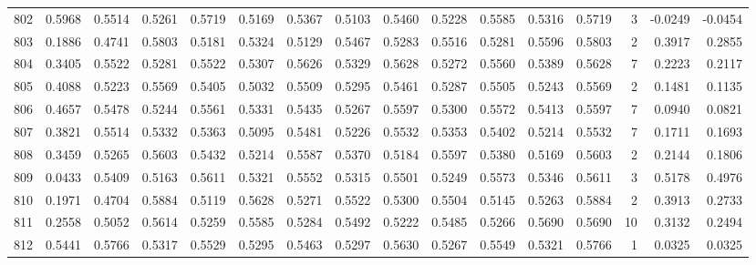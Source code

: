 \begin{tabular}{lrrrrrrrrrrrrrrr}
802 &      0.5968 &  0.5514 &  0.5261 &  0.5719 &  0.5169 &  0.5367 &  0.5103 &  0.5460 &  0.5228 &  0.5585 &   0.5316 &     0.5719 &      3 &                   -0.0249 &                    -0.0454 \\
803 &      0.1886 &  0.4741 &  0.5803 &  0.5181 &  0.5324 &  0.5129 &  0.5467 &  0.5283 &  0.5516 &  0.5281 &   0.5596 &     0.5803 &      2 &                    0.3917 &                     0.2855 \\
804 &      0.3405 &  0.5522 &  0.5281 &  0.5522 &  0.5307 &  0.5626 &  0.5329 &  0.5628 &  0.5272 &  0.5560 &   0.5389 &     0.5628 &      7 &                    0.2223 &                     0.2117 \\
805 &      0.4088 &  0.5223 &  0.5569 &  0.5405 &  0.5032 &  0.5509 &  0.5295 &  0.5461 &  0.5287 &  0.5505 &   0.5243 &     0.5569 &      2 &                    0.1481 &                     0.1135 \\
806 &      0.4657 &  0.5478 &  0.5244 &  0.5561 &  0.5331 &  0.5435 &  0.5267 &  0.5597 &  0.5300 &  0.5572 &   0.5413 &     0.5597 &      7 &                    0.0940 &                     0.0821 \\
807 &      0.3821 &  0.5514 &  0.5332 &  0.5363 &  0.5095 &  0.5481 &  0.5226 &  0.5532 &  0.5353 &  0.5402 &   0.5214 &     0.5532 &      7 &                    0.1711 &                     0.1693 \\
808 &      0.3459 &  0.5265 &  0.5603 &  0.5432 &  0.5214 &  0.5587 &  0.5370 &  0.5184 &  0.5597 &  0.5380 &   0.5169 &     0.5603 &      2 &                    0.2144 &                     0.1806 \\
809 &      0.0433 &  0.5409 &  0.5163 &  0.5611 &  0.5321 &  0.5552 &  0.5315 &  0.5501 &  0.5249 &  0.5573 &   0.5346 &     0.5611 &      3 &                    0.5178 &                     0.4976 \\
810 &      0.1971 &  0.4704 &  0.5884 &  0.5119 &  0.5628 &  0.5271 &  0.5522 &  0.5300 &  0.5504 &  0.5145 &   0.5263 &     0.5884 &      2 &                    0.3913 &                     0.2733 \\
811 &      0.2558 &  0.5052 &  0.5614 &  0.5259 &  0.5585 &  0.5284 &  0.5492 &  0.5222 &  0.5485 &  0.5266 &   0.5690 &     0.5690 &     10 &                    0.3132 &                     0.2494 \\
812 &      0.5441 &  0.5766 &  0.5317 &  0.5529 &  0.5295 &  0.5463 &  0.5297 &  0.5630 &  0.5267 &  0.5549 &   0.5321 &     0.5766 &      1 &                    0.0325 &                     0.0325 \\

\end{tabular}

